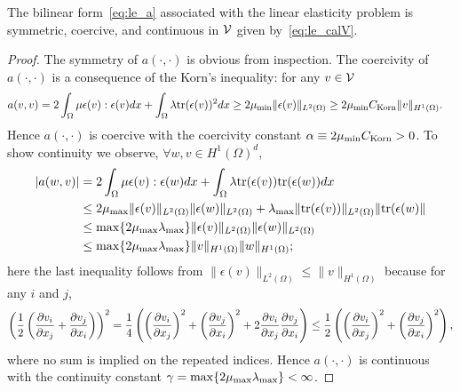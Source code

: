 
\begin{proposition}
  \label{prop:le_lm_a}
  The bilinear form~\eqref{eq:le_a} associated with the linear elasticity problem is symmetric, coercive, and continuous in $\mathcal{V}$ given by~\eqref{eq:le_calV}.
  \begin{proof}
    The symmetry of $a(\cdot,\cdot)$ is obvious from inspection. The coercivity of $a(\cdot,\cdot)$ is a consequence of the Korn's inequality: for any $v \in \mathcal{V}$
    \begin{align*}
      a(v,v)
      &= 2 \int_{\Omega} \mu \epsilon(v) : \epsilon(v) dx
      + \int_\Omega  \lambda \text{tr}(\epsilon(v))^2 dx
      \geq 2 \mu_{\rm min} \| \epsilon(v) \|_{L^2(\Omega)}
      \geq 2 \mu_{\rm min} C_{\rm Korn} \| v \|_{H^1(\Omega)}.
    \end{align*}
    Hence $a(\cdot,\cdot)$ is coercive with the coercivity constant $\alpha \equiv 2 \mu_{\rm min} C_{\rm Korn} > 0$. To show continuity we observe, $\forall w, v \in H^1(\Omega)^d$,
    \begin{align*}
      |a(w,v)|
      &= 2 \int_{\Omega} \mu \epsilon(v) : \epsilon(w) dx
      + \int_\Omega  \lambda \text{tr}(\epsilon(v))\text{tr}(\epsilon(w)) dx
      \\
      &\leq 2 \mu_{\rm max} \| \epsilon(v) \|_{L^2(\Omega)} \| \epsilon(w) \|_{L^2(\Omega)}
      + \lambda_{\rm max} \| \text{tr}(\epsilon(v)) \|_{L^2(\Omega)} \| \text{tr}(\epsilon(w) \|
      \\
      &\leq \max \{ 2\mu_{\rm max} \lambda_{\rm max} \} \| \epsilon(v) \|_{L^2(\Omega)} \| \epsilon(w) \|_{L^2(\Omega)}
      \\
      &\leq \max \{ 2\mu_{\rm max} \lambda_{\rm max} \} \| v \|_{H^1(\Omega)} \| w \|_{H^1(\Omega)};
    \end{align*}
    here the last inequality follows from $\| \epsilon(v) \|_{L^2(\Omega)} \leq  \| v \|_{H^1(\Omega)}$ because for any $i$ and $j$, 
    \begin{equation*}
      \left(\frac{1}{2}\left(\frac{\partial v_i}{\partial x_j} + \frac{\partial v_j}{\partial x_i}\right) \right)^2
      = \frac{1}{4} \left( \left( \frac{\partial v_i}{\partial x_j} \right)^2 +  \left( \frac{\partial v_j}{\partial x_i} \right)^2 +  2 \frac{\partial v_i}{\partial x_j} \frac{\partial v_j}{\partial x_i} \right)
      \leq \frac{1}{2} \left( \left( \frac{\partial v_i}{\partial x_j} \right)^2 +  \left( \frac{\partial v_j}{\partial x_i} \right)^2  \right),
    \end{equation*}
    where no sum is implied on the repeated indices.
    Hence $a(\cdot,\cdot)$ is continuous with the continuity constant $\gamma = \max \{ 2\mu_{\rm max} \lambda_{\rm max} \} < \infty$.
  \end{proof}
\end{proposition}
